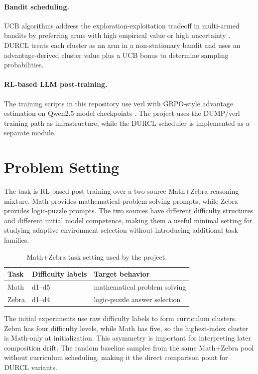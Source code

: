 \documentclass[10pt]{article}
\begin{document}
\paragraph{Bandit scheduling.}
UCB algorithms address the exploration-exploitation tradeoff in multi-armed bandits by preferring arms with high empirical value or high uncertainty \citep{auer2002finite}. DURCL treats each cluster as an arm in a non-stationary bandit and uses an advantage-derived cluster value plus a UCB bonus to determine sampling probabilities.

\paragraph{RL-based LLM post-training.}
The training scripts in this repository use verl with GRPO-style advantage estimation on Qwen2.5 model checkpoints \citep{schulman2017ppo,qwen2024qwen25,verl2024}. The project uses the DUMP/verl training path as infrastructure, while the DURCL scheduler is implemented as a separate module.

\section{Problem Setting}

The task is RL-based post-training over a two-source Math+Zebra reasoning mixture. Math provides mathematical problem-solving prompts, while Zebra provides logic-puzzle prompts. The two sources have different difficulty structures and different initial model competence, making them a useful minimal setting for studying adaptive environment selection without introducing additional task families.

\begin{table}[H]
\centering
\caption{Math+Zebra task setting used by the project.}
\label{tab:tasks}
\begin{tabular}{lll}
\toprule
Task & Difficulty labels & Target behavior \\
\midrule
Math & d1--d5 & mathematical problem solving \\
Zebra & d1--d4 & logic-puzzle answer selection \\
\bottomrule
\end{tabular}
\end{table}

The initial experiments use raw difficulty labels to form curriculum clusters. Zebra has four difficulty levels, while Math has five, so the highest-index cluster is Math-only at initialization. This asymmetry is important for interpreting later composition drift. The random baseline samples from the same Math+Zebra pool without curriculum scheduling, making it the direct comparison point for DURCL variants.
\end{document}
